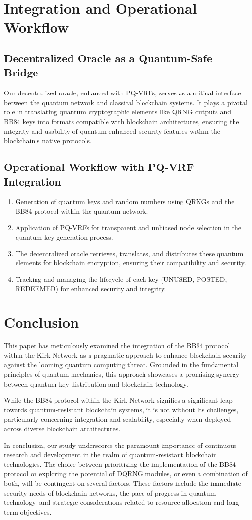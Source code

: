 \documentclass{article}
\begin{document}
\section{Integration and Operational Workflow}
\subsection{Decentralized Oracle as a Quantum-Safe Bridge}
Our decentralized oracle, enhanced with PQ-VRFs, serves as a critical interface between the quantum network and classical blockchain systems. It plays a pivotal role in translating quantum cryptographic elements like QRNG outputs and BB84 keys into formats compatible with blockchain architectures, ensuring the integrity and usability of quantum-enhanced security features within the blockchain’s native protocols.

\subsection{Operational Workflow with PQ-VRF Integration}
\begin{enumerate}
    \item Generation of quantum keys and random numbers using QRNGs and the BB84 protocol within the quantum network.
    \item Application of PQ-VRFs for transparent and unbiased node selection in the quantum key generation process.
    \item The decentralized oracle retrieves, translates, and distributes these quantum elements for blockchain encryption, ensuring their compatibility and security.
    \item Tracking and managing the lifecycle of each key (UNUSED, POSTED, REDEEMED) for enhanced security and integrity.
\end{enumerate}

\section{Conclusion}
This paper has meticulously examined the integration of the BB84 protocol within the Kirk Network as a pragmatic approach to enhance blockchain security against the looming quantum computing threat. Grounded in the fundamental principles of quantum mechanics, this approach showcases a promising synergy between quantum key distribution and blockchain technology.

While the BB84 protocol within the Kirk Network signifies a significant leap towards quantum-resistant blockchain systems, it is not without its challenges, particularly concerning integration and scalability, especially when deployed across diverse blockchain architectures.

In conclusion, our study underscores the paramount importance of continuous research and development in the realm of quantum-resistant blockchain technologies. The choice between prioritizing the implementation of the BB84 protocol or exploring the potential of DQRNG modules, or even a combination of both, will be contingent on several factors. These factors include the immediate security needs of blockchain networks, the pace of progress in quantum technology, and strategic considerations related to resource allocation and long-term objectives.
\end{document}
